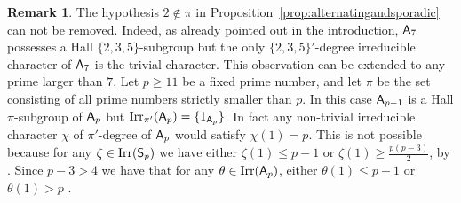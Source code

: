 \documentclass[12pt]{amsart}
\theoremstyle{definition}
\newtheorem{remark}[theorem]{Remark}
\numberwithin{equation}{section}
\newcommand{\Al}{\textup{\textsf{A}}}
\newcommand{\Sy}{\textup{\textsf{S}}}
\begin{document}
\begin{remark}
The %
hypothesis $2\notin \pi$ in
Proposition~\ref{prop:alternatingandsporadic} can not be removed.
Indeed, as already pointed out in the introduction, $\Al_7$
possesses a Hall $\{2,3,5\}$-subgroup %
but the only %
$\{2,3,5\}'$-degree irreducible character of $\Al_7$ is the trivial
character. This observation can %
be extended to any prime larger than
$7$. %
Let $p\geq 11$ be %
a fixed %
prime number, and %
let $\pi$ be the
set consisting of all prime numbers strictly %
smaller than $p$. In %
this case $\Al_{p-1}$ is a Hall $\pi$-subgroup of $\Al_p$ but
$\mathrm{Irr}_{\pi'}(\Al_p)=\{1_{\Al_p}\}$. In fact any non-trivial
irreducible character $\chi$ of $\pi'$-degree of $\Al_p$ would
satisfy $\chi(1)=p$. %
This is not %
possible because for any
$\zeta\in\mathrm{Irr}(\Sy_p)$ we have either $\zeta(1)\leq p-1$ %
or
$\zeta(1)\geq \frac{p(p-3)}{2}$, by %
\cite{Rasala}. Since $p-3> 4$ we
have that for any $\theta\in\mathrm{Irr}(\Al_p)$, either
$\theta(1)\leq p-1$ or $\theta(1)>p$%
.
\end{remark}
\end{document}
